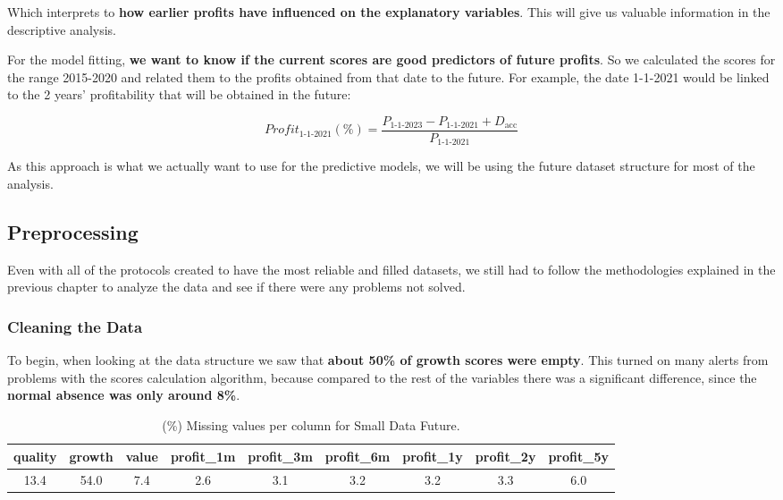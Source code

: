 \documentclass[11pt,english,a4paper,hidelinks]{book}
\begin{document}
\noindent Which interprets to \textbf{how earlier profits have influenced on the explanatory variables}. This will give us valuable information in the descriptive analysis.

\vspace{0.5cm}
\noindent For the model fitting, \textbf{we want to know if the current scores are good predictors of future profits}. So we calculated the scores for the range 2015-2020 and related them to the profits obtained from that date to the future. For example, the date 1-1-2021 would be linked to the 2 years' profitability that will be obtained in the future: 

\begin{equation}
    Profit_{1\text{-}1\text{-}2021}(\%) = \frac{P_{1\text{-}1\text{-}2023} - P_{1\text{-}1\text{-}2021} + D_{\text{acc}}}{P_{1\text{-}1\text{-}2021}}
\end{equation}

\noindent As this approach is what we actually want to use for the predictive models, we will be using the future dataset structure for most of the analysis.

\subsection{Preprocessing}
Even with all of the protocols created to have the most reliable and filled datasets, we still had to follow the methodologies explained in the previous chapter to analyze the data and see if there were any problems not solved.

\subsubsection{Cleaning the Data}
To begin, when looking at the data structure we saw that \textbf{about 50\% of growth scores were empty}. This turned on many alerts from problems with the scores calculation algorithm, because compared to the rest of the variables there was a significant difference, since the \textbf{normal absence was only around 8\%}.
\begin{table}[H]
    \centering
    \caption{(\%) Missing values per column for Small Data Future.}
    \begin{tabular}{|c|c|c|c|c|c|c|c|c|}
        \hline
        \textbf{quality} & \textbf{growth} & \textbf{value} & \textbf{profit\_1m} & \textbf{profit\_3m} & \textbf{profit\_6m} & \textbf{profit\_1y} & \textbf{profit\_2y} & \textbf{profit\_5y} \\
        \hline
        13.4 & 54.0 & 7.4 & 2.6 & 3.1 & 3.2 & 3.2 & 3.3 & 6.0 \\
        \hline
    \end{tabular}
    \label{tab:missing_values_small_data_future}
\end{table}
\end{document}
